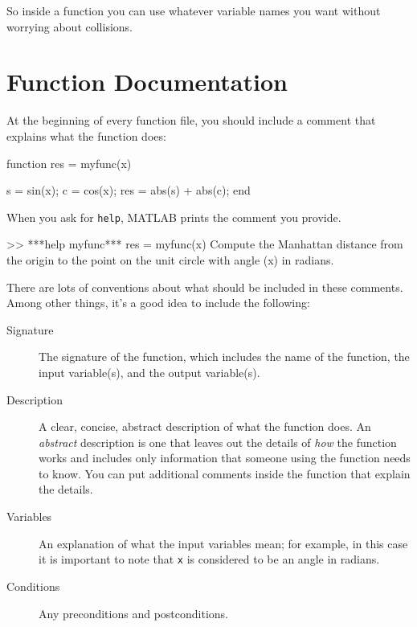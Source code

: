 So inside a function you can use whatever variable names you
want without worrying about collisions.



\section{Function Documentation}


At the beginning of every function file, you should include a comment that explains what the function does:


\begin{code}

function res = myfunc(x)

    s = sin(x);
    c = cos(x);
    res = abs(s) + abs(c);
end
\end{code}

When you ask for \lstinline{help}, MATLAB prints the comment you provide.


\begin{code}
>> ***help myfunc***
  res = myfunc(x)
  Compute the Manhattan distance from the origin to the
  point on the unit circle with angle (x) in radians.
\end{code}

There are lots of conventions about what should be included
in these comments.  Among other things, it's a good idea to
include the following:

\begin{description}

\item [Signature] The signature of the function, which includes the name
of the function, the input variable(s), and the output variable(s).

\item [Description] A clear, concise, abstract description of what the function does.
An \emph{abstract} description is one that leaves out the
details of \emph{how} the function works and includes only information
that someone \linebreak using the function needs to know.  You can put additional
comments inside the function that explain the details.

\item [Variables] An explanation of what the input variables mean; for example,
in this case it is important to note that \lstinline{x} is considered
to be an angle in radians.

\item [Conditions] Any preconditions and postconditions.

\end{description}

